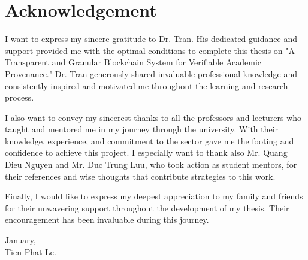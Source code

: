 \chapter*{Acknowledgement}

\begin{flushleft}
I want to express my sincere gratitude to Dr. Tran. His dedicated guidance and support provided me with the optimal conditions to complete this thesis on "A Transparent and Granular Blockchain System for Verifiable Academic Provenance." Dr. Tran generously shared invaluable professional knowledge and consistently inspired and motivated me throughout the learning and research process.

\vspace{0.5cm}

I also want to convey my sincerest thanks to all the professors and lecturers who taught and mentored me in my journey through the university. With their knowledge, experience, and commitment to the sector gave me the footing and confidence to achieve this project. I especially want to thank also Mr. Quang Dieu Nguyen and Mr. Duc Trung Luu, who took action as student mentors, for their references and wise thoughts that contribute strategies to this work.

\vspace{0.5cm}

Finally, I would like to express my deepest appreciation to my family and friends for their unwavering support throughout the development of my thesis. Their encouragement has been invaluable during this journey.
\end{flushleft}

\vspace{0.5cm}

\begin{flushright}
January, \\
Tien Phat Le.
\end{flushright}